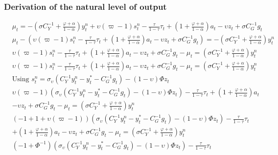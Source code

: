 \subsubsection*{Derivation of the natural level of output}
\begin{align} \label{eq:appendix_natural_level_of_output_beginning}
    &\mu_t = -\left(\sigma C_Y^{-1} + \frac{\varphi + \alpha}{1-\alpha}\right)y^n_t + \upsilon (\varpi - 1) s^n_t - \frac{\tau}{1-\tau}\tau_t  + \left(1 + \frac{\varphi + \alpha}{1-\alpha}\right)a_t - \upsilon z_t + \sigma C_G^{-1} g_t\\
    &\mu_t - \left( \upsilon (\varpi - 1) s^n_t - \frac{\tau}{1-\tau}\tau_t  + \left(1 + \frac{\varphi + \alpha}{1-\alpha}\right)a_t - \upsilon z_t + \sigma C_G^{-1} g_t \right) = -\left(\sigma C_Y^{-1} + \frac{\varphi + \alpha}{1-\alpha}\right)y^n_t\\
    &\upsilon (\varpi - 1) s^n_t - \frac{\tau}{1-\tau}\tau_t  + \left(1 + \frac{\varphi + \alpha}{1-\alpha}\right)a_t - \upsilon z_t + \sigma C_G^{-1} g_t-\mu_t = \left(\sigma C_Y^{-1} + \frac{\varphi + \alpha}{1-\alpha}\right)y^n_t\\
    &\upsilon (\varpi - 1) s^n_t - \frac{\tau}{1-\tau}\tau_t  + \left(1 + \frac{\varphi + \alpha}{1-\alpha}\right)a_t - \upsilon z_t + \sigma C_G^{-1} g_t-\mu_t = \left(\sigma C_Y^{-1} + \frac{\varphi + \alpha}{1-\alpha}\right)y^n_t\\
    &\text{Using $s^n_t = \sigma_\upsilon(C_Y^{-1} y^n_t - y^*_t - C_G^{-1} g_t) - (1-\upsilon)\Phi z_t$} \nonumber\\
    &\upsilon (\varpi - 1) (\sigma_\upsilon(C_Y^{-1} y^n_t - y^*_t - C_G^{-1} g_t) - (1-\upsilon)\Phi z_t) - \frac{\tau}{1-\tau}\tau_t  + \left(1 + \frac{\varphi + \alpha}{1-\alpha}\right)a_t \nonumber \\ 
        &- \upsilon z_t + \sigma C_G^{-1} g_t-\mu_t = \left(\sigma C_Y^{-1} + \frac{\varphi + \alpha}{1-\alpha}\right)y^n_t\\
    &(- 1 + 1 + \upsilon (\varpi - 1)) (\sigma_\upsilon(C_Y^{-1} y^n_t - y^*_t - C_G^{-1} g_t) - (1-\upsilon)\Phi z_t) - \frac{\tau}{1-\tau}\tau_t  \nonumber \\ 
        &+ \left(1 + \frac{\varphi + \alpha}{1-\alpha}\right)a_t - \upsilon z_t + \sigma C_G^{-1} g_t-\mu_t = \left(\sigma C_Y^{-1} + \frac{\varphi + \alpha}{1-\alpha}\right)y^n_t\\
    &(- 1 + \Phi^{-1}) (\sigma_\upsilon(C_Y^{-1} y^n_t - y^*_t - C_G^{-1} g_t) - (1-\upsilon)\Phi z_t) - \frac{\tau}{1-\tau}\tau_t  \nonumber \\

\end{align}
